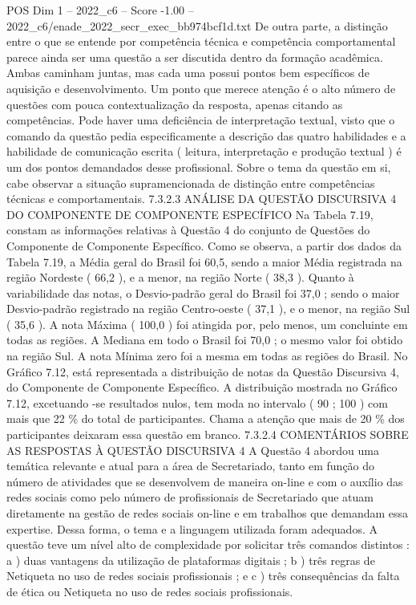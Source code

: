 \begin{textsample}{POS Dim 1 – 2022\_c6 – Score -1.00 – 2022\_c6/enade\_2022\_secr\_exec\_bb974bcf1d.txt}
De outra parte, a distinção entre o que se entende por competência técnica e competência comportamental parece ainda ser uma questão a ser discutida dentro da formação acadêmica.
Ambas caminham juntas, mas cada uma possui pontos bem específicos de aquisição e desenvolvimento.
Um ponto que merece atenção é o alto número de questões com pouca contextualização da resposta, apenas citando as competências.
Pode haver uma deficiência de interpretação textual, visto que o comando da questão pedia especificamente a descrição das quatro habilidades e a habilidade de comunicação escrita ( leitura, interpretação e produção textual ) é um dos pontos demandados desse profissional.
Sobre o tema da questão em si, cabe observar a situação supramencionada de distinção entre competências técnicas e comportamentais. 7.3.2.3 ANÁLISE DA QUESTÃO DISCURSIVA 4 DO COMPONENTE DE COMPONENTE ESPECÍFICO Na Tabela 7.19, constam as informações relativas à Questão 4 do conjunto de Questões do Componente de Componente Específico.
Como se observa, a partir dos dados da Tabela 7.19, a Média geral do Brasil foi 60,5, sendo a maior Média registrada na região Nordeste ( 66,2 ), e a menor, na região Norte ( 38,3 ).
Quanto à variabilidade das notas, o Desvio-padrão geral do Brasil foi 37,0 ; sendo o maior Desvio-padrão registrado na região Centro-oeste ( 37,1 ), e o menor, na região Sul ( 35,6 ).
A nota Máxima ( 100,0 ) foi atingida por, pelo menos, um concluinte em todas as regiões.
A Mediana em todo o Brasil foi 70,0 ; o mesmo valor foi obtido na região Sul.
A nota Mínima zero foi a mesma em todas as regiões do Brasil.
No Gráfico 7.12, está representada a distribuição de notas da Questão Discursiva 4, do Componente de Componente Específico.
A distribuição mostrada no Gráfico 7.12, excetuando -se resultados nulos, tem moda no intervalo ( 90 ; 100 ) com mais que 22 \% do total de participantes.
Chama a atenção que mais de 20 \% dos participantes deixaram essa questão em branco. 7.3.2.4 COMENTÁRIOS SOBRE AS RESPOSTAS À QUESTÃO DISCURSIVA 4 A Questão 4 abordou uma temática relevante e atual para a área de Secretariado, tanto em função do número de atividades que se desenvolvem de maneira on-line e com o auxílio das redes sociais como pelo número de profissionais de Secretariado que atuam diretamente na gestão de redes sociais on-line e em trabalhos que demandam essa expertise.
Dessa forma, o tema e a linguagem utilizada foram adequados.
A questão teve um nível alto de complexidade por solicitar três comandos distintos : a ) duas vantagens da utilização de plataformas digitais ; b ) três regras de Netiqueta no uso de redes sociais profissionais ; e c ) três consequências da falta de ética ou Netiqueta no uso de redes sociais profissionais.

\end{textsample}
